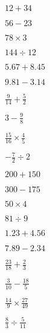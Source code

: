 \documentclass[10pt]{exam}
\begin{document}
\begin{questions}
\begin{multicols}{2}
\question \( 12 + 34 \)
\vspace*{0.5in}

\question \( 56 - 23 \)
\vspace*{0.5in}

\question \( 78 \times 3 \)
\vspace*{0.5in}

\question \( 144 \div 12 \)
\vspace*{0.5in}

\question \( 5.67 + 8.45 \)
\vspace*{0.5in}

\question \( 9.81 - 3.14 \)
\vspace*{0.5in}

\question \( \displaystyle \frac{9}{14} + \frac{5}{2} \)
\vspace*{0.5in}

\question \( \displaystyle 3 - \frac{9}{8} \)
\vspace*{0.5in}

\question \( \displaystyle \frac{15}{16} \times \frac{4}{5} \)
\vspace*{0.5in}

\question \( \displaystyle -\frac{7}{2} \div 2 \)
\vspace*{0.5in}

\question \( 200 + 150 \)
\vspace*{0.5in}

\question \( 300 - 175 \)
\vspace*{0.5in}

\question \( 50 \times 4 \)
\vspace*{0.5in}

\question \( 81 \div 9 \)
\vspace*{0.5in}

\question \( 1.23 + 4.56 \)
\vspace*{0.5in}

\question \( 7.89 - 2.34 \)
\vspace*{0.5in}

\question \( \displaystyle \frac{23}{18} + \frac{2}{3} \)
\vspace*{0.5in}

\question \( \displaystyle \frac{3}{10} - \frac{18}{5} \)
\vspace*{0.5in}

\question \( \displaystyle \frac{14}{9} \times \frac{27}{49} \)
\vspace*{0.5in}

\question \( \displaystyle \frac{8}{3} \div \frac{5}{11} \)
\vspace*{0.5in}

\end{multicols}
\end{questions}
\end{document}
